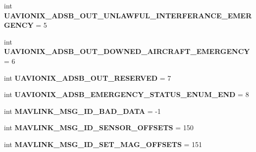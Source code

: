 \begin{DoxyCompactItemize}
\item 
\mbox{\label{namespacepymavlink_1_1dialects_1_1v10_a785e955a98d49a345faae7375d8a8092}} 
int {\bfseries U\+A\+V\+I\+O\+N\+I\+X\+\_\+\+A\+D\+S\+B\+\_\+\+O\+U\+T\+\_\+\+U\+N\+L\+A\+W\+F\+U\+L\+\_\+\+I\+N\+T\+E\+R\+F\+E\+R\+A\+N\+C\+E\+\_\+\+E\+M\+E\+R\+G\+E\+N\+CY} = 5
\item 
\mbox{\label{namespacepymavlink_1_1dialects_1_1v10_ab9f11c8d865e7d0b7a87ee44ddbc4d6a}} 
int {\bfseries U\+A\+V\+I\+O\+N\+I\+X\+\_\+\+A\+D\+S\+B\+\_\+\+O\+U\+T\+\_\+\+D\+O\+W\+N\+E\+D\+\_\+\+A\+I\+R\+C\+R\+A\+F\+T\+\_\+\+E\+M\+E\+R\+G\+E\+N\+CY} = 6
\item 
\mbox{\label{namespacepymavlink_1_1dialects_1_1v10_a4daaa6982e9696733c943fd03af5e4ab}} 
int {\bfseries U\+A\+V\+I\+O\+N\+I\+X\+\_\+\+A\+D\+S\+B\+\_\+\+O\+U\+T\+\_\+\+R\+E\+S\+E\+R\+V\+ED} = 7
\item 
\mbox{\label{namespacepymavlink_1_1dialects_1_1v10_a624d4bcff2bc17b8c4ea918815fa08d0}} 
int {\bfseries U\+A\+V\+I\+O\+N\+I\+X\+\_\+\+A\+D\+S\+B\+\_\+\+E\+M\+E\+R\+G\+E\+N\+C\+Y\+\_\+\+S\+T\+A\+T\+U\+S\+\_\+\+E\+N\+U\+M\+\_\+\+E\+ND} = 8
\item 
\mbox{\label{namespacepymavlink_1_1dialects_1_1v10_ab540e60a26f11b21ab290f0cb75c6273}} 
int {\bfseries M\+A\+V\+L\+I\+N\+K\+\_\+\+M\+S\+G\+\_\+\+I\+D\+\_\+\+B\+A\+D\+\_\+\+D\+A\+TA} = -\/1
\item 
\mbox{\label{namespacepymavlink_1_1dialects_1_1v10_ad352de1ca4a36d9c883838d4418da0c5}} 
int {\bfseries M\+A\+V\+L\+I\+N\+K\+\_\+\+M\+S\+G\+\_\+\+I\+D\+\_\+\+S\+E\+N\+S\+O\+R\+\_\+\+O\+F\+F\+S\+E\+TS} = 150
\item 
\mbox{\label{namespacepymavlink_1_1dialects_1_1v10_a394a3ec4faa39f0307d32ec7a9cc5a01}} 
int {\bfseries M\+A\+V\+L\+I\+N\+K\+\_\+\+M\+S\+G\+\_\+\+I\+D\+\_\+\+S\+E\+T\+\_\+\+M\+A\+G\+\_\+\+O\+F\+F\+S\+E\+TS} = 151
\item 
\mbox{\label{namespacepymavlink_1_1dialects_1_1v10_a3c070f9187a250cc3a21d3110c6ae15a}} 

\end{DoxyCompactItemize}

